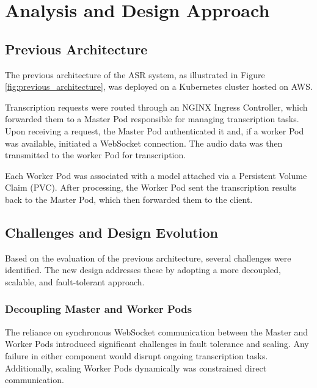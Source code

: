 \chapter{Analysis and Design Approach} \label{chapter:analysis_and_design}
\section{Previous Architecture}
The previous architecture of the ASR system, as illustrated in Figure \ref{fig:previous_architecture}, was deployed on a Kubernetes cluster hosted on AWS.

Transcription requests were routed through an NGINX Ingress Controller, which forwarded them to a Master Pod responsible for managing transcription tasks. Upon receiving a request, the Master Pod authenticated it and, if a worker Pod was available, initiated a WebSocket connection. The audio data was then transmitted to the worker Pod for transcription.

Each Worker Pod was associated with a model attached via a Persistent Volume Claim (PVC). After processing, the Worker Pod sent the transcription results back to the Master Pod, which then forwarded them to the client.

\section{Challenges and Design Evolution}
Based on the evaluation of the previous architecture, several challenges were identified. The new design addresses these by adopting a more decoupled, scalable, and fault-tolerant approach.

\subsection{Decoupling Master and Worker Pods}
The reliance on synchronous WebSocket communication between the Master and Worker Pods introduced significant challenges in fault tolerance and scaling. Any failure in either component would disrupt ongoing transcription tasks. Additionally, scaling Worker Pods dynamically was constrained direct communication.


